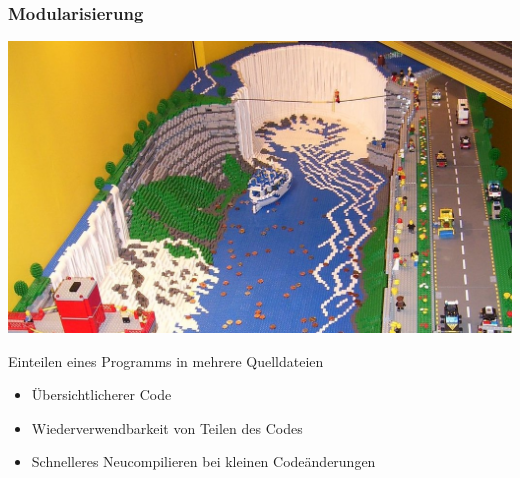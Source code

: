 \documentclass{slides}
\begin{document}
\begin{frame}
  \frametitle{Modularisierung}
  \centering
  \includegraphics[height=7\baselineskip]{lego}

  \begin{alertbox}{0.9\textwidth}
    Einteilen eines Programms in mehrere Quelldateien    
  \end{alertbox}

  \begin{itemize}
  \item Übersichtlicherer Code
  \item Wiederverwendbarkeit von Teilen des Codes
  \item Schnelleres Neucompilieren bei kleinen Codeänderungen
  \end{itemize}
\end{frame}
\end{document}
